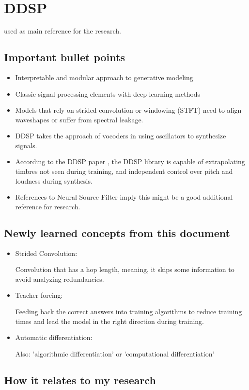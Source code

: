 \section{DDSP}

\cite{DDSP} used as main reference for the research.

\subsection{Important bullet points}

\begin{itemize}
    \item Interpretable and modular approach to generative modeling
    \item Classic signal processing elements with deep learning methods
    \item Models that rely on strided convolution or windowing (STFT)
    need to align waveshapes or suffer from spectral leakage.
    \item DDSP takes the approach of vocoders in using oscillators to
    synthesize signals.
    \item According to the DDSP paper \cite{DDSP}, the DDSP library is capable
    of extrapolating timbres not seen during training, and independent control
    over pitch and loudness during synthesis.
    \item References to Neural Source Filter \cite{neuralsourcefilter} imply
    this might be a good additional reference for research.

\end{itemize}

\subsection{Newly learned concepts from this document}

\begin{itemize}
    \item Strided Convolution:
    
    Convolution that has a hop length, meaning, it skips some information
    to avoid analyzing redundancies.

    \item Teacher forcing:
    
    Feeding back the correct answers into training algorithms 
    to reduce training times and lead the model in the right direction during training.

    \item Automatic differentiation:
    
    Also: 'algorithmic differentiation' or 'computational differentiation'
\end{itemize}

\subsection{How it relates to my research}